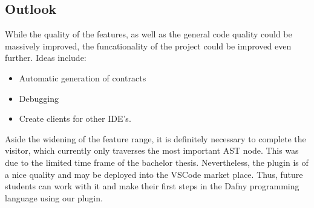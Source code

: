 \subsection{Outlook}
While the quality of the features, as well as the general code quality could be massively improved, the funcationality of the project could be improved even further.
Ideas include:
\begin{itemize}
    \item Automatic generation of contracts
    \item Debugging
    \item Create clients for other IDE's.
\end{itemize}
Aside the widening of the feature range, it is definitely necessary to complete the visitor, which currently only traverses the most important AST node.
This was due to the limited time frame of the bachelor thesis.
Nevertheless, the plugin is of a nice quality and may be deployed into the VSCode market place.
Thus, future students can work with it and make their first steps in the Dafny programming language using our plugin.








